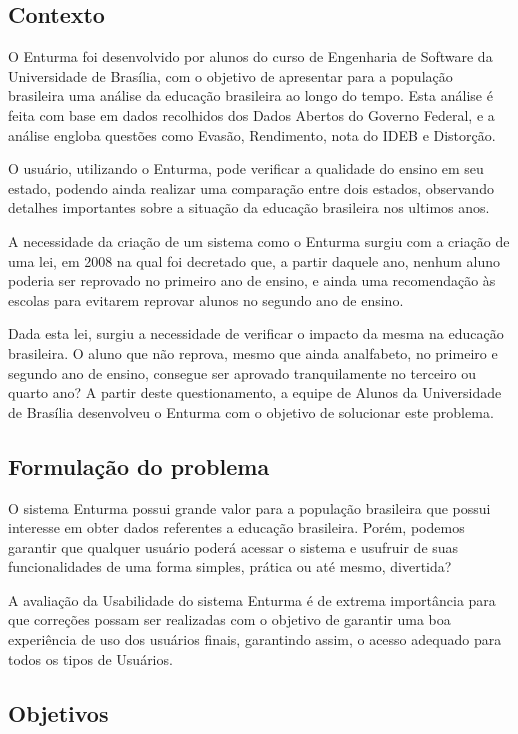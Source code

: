 \subsection{Contexto}
	

	O Enturma foi desenvolvido por alunos do curso de Engenharia de Software da Universidade de Brasília, com o objetivo de apresentar para a população brasileira uma análise da educação brasileira ao longo do tempo. Esta análise é feita com base em dados recolhidos dos Dados Abertos do Governo Federal, e a análise engloba questões como Evasão, Rendimento, nota do IDEB e Distorção.

	O usuário, utilizando o Enturma, pode verificar a qualidade do ensino em seu estado, podendo ainda realizar uma comparação entre dois estados, observando detalhes importantes sobre a situação da educação brasileira nos ultimos anos.

	A necessidade da criação de um sistema como o Enturma surgiu com a criação de uma lei, em 2008 na qual foi decretado que, a partir daquele ano, nenhum aluno poderia ser reprovado no primeiro ano de ensino, e ainda uma recomendação às escolas para evitarem reprovar alunos no segundo ano de ensino.

	Dada esta lei, surgiu a necessidade de verificar o impacto da mesma na educação brasileira. O aluno que não reprova, mesmo que ainda analfabeto, no primeiro e segundo ano de ensino, consegue ser aprovado tranquilamente no terceiro ou quarto ano? A partir deste questionamento, a equipe de Alunos da Universidade de Brasília desenvolveu o Enturma com o objetivo de solucionar este problema.

\subsection{Formulação do problema}
	
	O sistema Enturma possui grande valor para a população brasileira que possui interesse em obter dados referentes a educação brasileira. Porém, podemos garantir que qualquer usuário poderá acessar o sistema e usufruir de suas funcionalidades de uma forma simples, prática ou até mesmo, divertida? 

	A avaliação da Usabilidade do sistema Enturma é de extrema importância para que correções possam ser realizadas com o objetivo de garantir uma boa experiência de uso dos usuários finais, garantindo assim, o acesso adequado para todos os tipos de Usuários.

\subsection{Objetivos}

